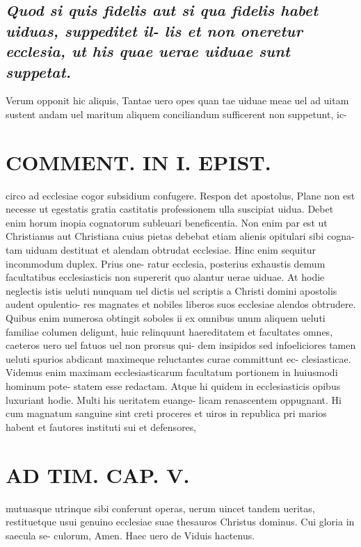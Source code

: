 \documentclass{article}
\begin{document}
\begin{pages}
\subsection*{\textit{Quod si quis fidelis aut si qua fidelis habet uiduas, suppeditet il- lis et non oneretur ecclesia, ut his quae uerae uiduae sunt suppetat. }}\pstart Verum opponit hic aliquis, Tantae uero opes quan tae uiduae meae uel ad uitam sustent andam uel maritum aliquem conciliandum sufficerent non suppetunt, ic-  \pend
\section*{COMMENT. IN I. EPIST. }\pstart circo ad ecclesiae cogor subsidium confugere. Respon det apostolus, Plane non est necesse ut egestatis gratia castitatis professionem ulla suscipiat uidua. Debet enim horum inopia cognatorum subleuari beneficentia. Non enim par est ut Christianus aut Christiana cuius pietas debebat etiam alienis opitulari sibi cogna- tam uiduam destituat et alendam obtrudat ecclesiae. Hinc enim sequitur incommodum duplex. Prius one- ratur ecclesia, posterius exhaustis demum facultatibus ecclesiasticis non supererit quo alantur uerae uiduae. At hodie neglectis istis ueluti nunquam uel dictis uel scriptis a Christi domini apostolis audent opulentio- res magnates et nobiles liberos suos ecclesiae alendos obtrudere. Quibus enim numerosa obtingit soboles ii ex omnibus unum aliquem ueluti familiae columen deligunt, huic relinquunt haereditatem et facultates omnes, caeteros uero uel fatuos uel non prorsus qui- dem insipidos sed infoeliciores tamen ueluti spurios abdicant maximeque reluctantes curae committunt ec- clesiasticae. Videmus enim maximam ecclesiasticarum facultatum portionem in huiusmodi hominum pote- statem esse redactam. Atque hi quidem in ecclesiasticis opibus luxuriant hodie. Multi his ueritatem euange- licam renascentem oppugnant. Hi cum magnatum sanguine sint creti proceres et uiros in republica pri marios habent et fautores instituti sui et defensores,  \pend
\section*{AD TIM. CAP. V. }
\marginpar{[ p.156 ]}\pstart mutuasque utrinque sibi conferunt operas, uerum uincet tandem ueritas, restituetque usui genuino ecclesiae suae thesauros Christus dominus. Cui gloria in saecula se- culorum, Amen. Haec uero de Viduis hactenus.  \pend
{}
{}

\end{pages}
\end{document}
